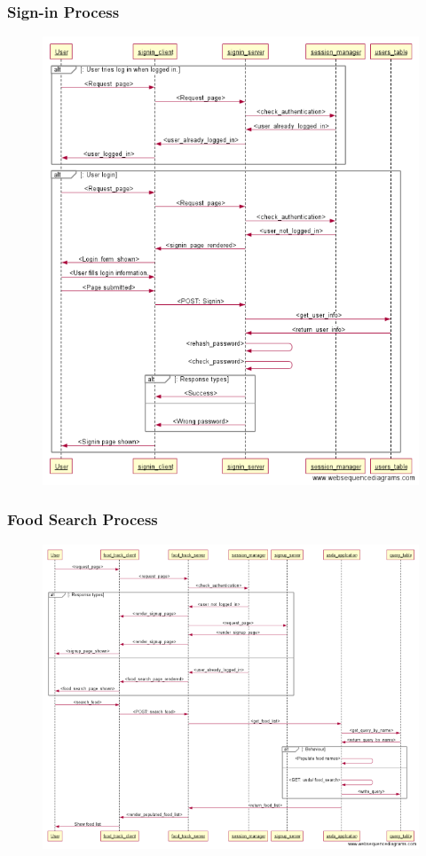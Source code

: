 \subsubsection{Sign-in Process}
\begin{figure}
\centering
\includegraphics[scale=0.70]{signin}
\end{figure}


\newpage
\subsubsection{Food Search Process}
\begin{figure}
\centering
\includegraphics[scale=0.70]{search_food}
\end{figure}



